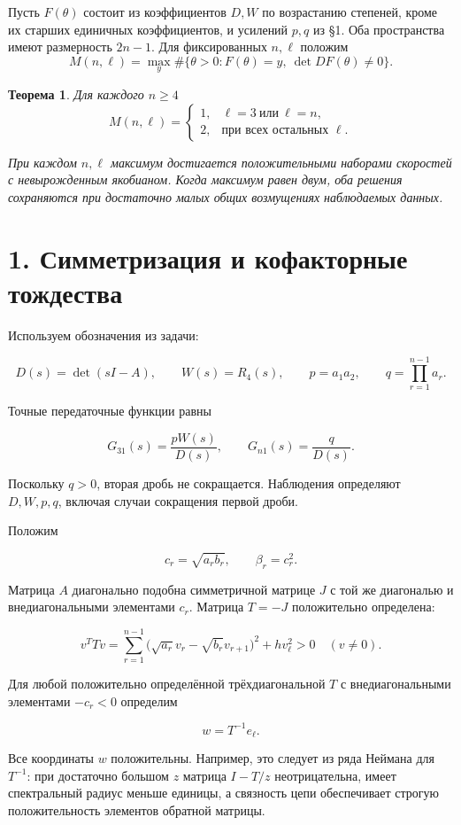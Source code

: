 \documentclass[11pt,a4paper]{article}
\newtheorem{mainthm}{Теорема}
\begin{document}
Пусть \(F(\theta)\) состоит из коэффициентов \(D,W\) по возрастанию степеней, кроме их старших единичных коэффициентов, и усилений \(p,q\) из §1. Оба пространства имеют размерность \(2n-1\). Для фиксированных \(n,\ell\) положим
\[
M(n,\ell)=\max_y \#\{\theta>0:F(\theta)=y,\ \det DF(\theta)\ne0\}.
\]

\begin{mainthm}\label{thm:count} Для каждого \(n\ge4\)
\[
M(n,\ell)=
\begin{cases}
1,&\ell=3\ \text{или}\ \ell=n,\\
2,&\text{при всех остальных }\ell .
\end{cases}
\]

При каждом \(n,\ell\) максимум достигается положительными наборами скоростей с невырожденным якобианом. Когда максимум равен двум, оба решения сохраняются при достаточно малых общих возмущениях наблюдаемых данных.\end{mainthm}


\section*{\color{ink} 1. Симметризация и кофакторные тождества}

Используем обозначения из задачи:

\[
D(s)=\det(sI-A),\qquad W(s)=R_4(s),
\qquad p=a_1a_2,\qquad q=\prod_{r=1}^{n-1}a_r.
\]

Точные передаточные функции равны

\[
G_{31}(s)=\frac{pW(s)}{D(s)},\qquad
G_{n1}(s)=\frac q{D(s)}.
\]

Поскольку \(q>0\), вторая дробь не сокращается. Наблюдения определяют \(D,W,p,q\), включая случаи сокращения первой дроби.

Положим

\[
c_r=\sqrt{a_rb_r},\qquad \beta_r=c_r^2.
\]

Матрица \(A\) диагонально подобна симметричной матрице \(J\) с той же диагональю и внедиагональными элементами \(c_r\). Матрица \(T=-J\) положительно определена:

\[
v^TTv=
\sum_{r=1}^{n-1}
\bigl(\sqrt{a_r}v_r-\sqrt{b_r}v_{r+1}\bigr)^2
+h v_\ell^2>0
\quad(v\ne0).
\]

Для любой положительно определённой трёхдиагональной \(T\) с внедиагональными элементами \(-c_r<0\) определим

\[
w=T^{-1}e_\ell.
\]

Все координаты \(w\) положительны. Например, это следует из ряда Неймана для \(T^{-1}\): при достаточно большом \(z\) матрица \(I-T/z\) неотрицательна, имеет спектральный радиус меньше единицы, а связность цепи обеспечивает строгую положительность элементов обратной матрицы.
\end{document}
